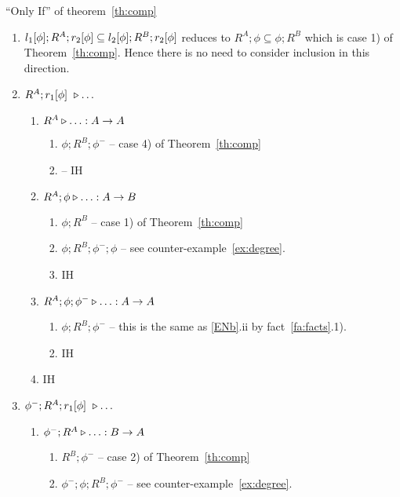 \documentclass[10pt]{article}
\begin{document}
\begin{Proof} 
``{\sc Only If}'' of theorem~\ref{th:comp}
\begin{enumerate}\MyLPar
\item 
$l_1[\phi];R^A;r_2[\phi] \subseteq l_2[\phi];R^B;r_2[\phi]$ reduces to 
$R^A;\phi \subseteq \phi;R^B$ which is case 1) of
Theorem~\ref{th:comp}. Hence there is no need to consider
inclusion in this direction.
\item 
$R^A;r_1[\phi]\ \triangleright\ldots$
  \begin{enumerate}\MyLPar
   \item $R^A \triangleright\ldots : A\rightarrow A$
    \begin{enumerate}\MyLPar
     \item $\phi;R^B;\phi^-$ -- case 4) of Theorem~\ref{th:comp}
     \item -- IH
    \end{enumerate}
   \item\label{ENb} $R^A;\phi \triangleright\ldots : A\rightarrow B$
    \begin{enumerate}\MyLPar
     \item $\phi;R^B$ -- case 1) of Theorem~\ref{th:comp}
     \item $\phi;R^B;\phi^-;\phi$ -- see counter-example~\ref{ex:degree}.
     \item IH
    \end{enumerate}
   \item $R^A;\phi;\phi^-\triangleright\ldots : A\rightarrow A$
    \begin{enumerate}\MyLPar
     \item $\phi;R^B;\phi^-$ -- this is the same as \ref{ENb}.ii 
           by fact~\ref{fa:facts}.1).
     \item IH
    \end{enumerate}
   \item IH
  \end{enumerate}
\item $\phi^-;R^A;\Ra\ \almost\ldots$ 
  \begin{enumerate}\MyLPar
   \item\label{aa} $\phi^-;R^A \triangleright\ldots : B\rightarrow A$
    \begin{enumerate}\MyLPar
      \item $R^B;\phi^-$ -- case 2) of Theorem~\ref{th:comp}
      \item $\phi^-;\phi;R^B;\phi^-$ -- see counter-example~\ref{ex:degree}. 

\end{enumerate}
\end{enumerate}
\end{enumerate}
\end{Proof}
\end{document}
